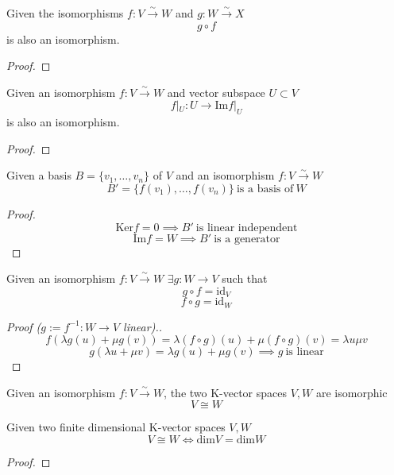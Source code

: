 \begin{lemma}
   Given the isomorphisms \(f: V \xrightarrow{\sim} W\) and \(g: W \xrightarrow{\sim} X\)
   \[g \circ f\]
   is also an isomorphism.
\end{lemma}
\begin{proof}
\end{proof}

\begin{lemma}
   Given an isomorphism \(f: V \xrightarrow{\sim} W\) and vector subspace \(U \subset V\)
   \[f|_{U}: U \to \text{Im}f|_{U}\]
   is also an isomorphism.
\end{lemma}
\begin{proof}
\end{proof}

\begin{lemma}
   Given a basis \(B = \{v_1, \ldots, v_n\}\) of \(V\) and an isomorphism \(f: V \xrightarrow{\sim} W\)
   \[B' = \{f(v_1), \ldots, f(v_n)\}~\text{is a basis of}~W\]
\end{lemma}
\begin{proof}
   \[\text{Ker}f = 0 \implies B'~\text{is linear independent}\]
   \[\text{Im}f = W \implies B'~\text{is a generator}\]
\end{proof}

\begin{lemma}
   Given an isomorphism \(f: V \xrightarrow{\sim} W\) \(\exists g: W \to V\) such that
   \[g \circ f = \text{id}_V\]
   \[f \circ g = \text{id}_W\]
\end{lemma}
\begin{proof}[Proof (\(g := f^{-1}: W \to V\) linear).]
   \[f(\lambda g(u) + \mu g(v)) = \lambda (f \circ g)(u) + \mu (f \circ g)(v) = \lambda u \mu v\]
   \[g(\lambda u + \mu v) = \lambda g(u) + \mu g(v) \implies g~\text{is linear}\]
\end{proof}

\begin{definition}[Isomorphic]
   Given an isomorphism \(f: V \xrightarrow{\sim} W\), the two K-vector spaces \(V, W\) are isomorphic
   \[V \cong W\]
\end{definition}

\begin{theorem}
   Given two finite dimensional K-vector spaces \(V, W\)
   \[V \cong W \iff \text{dim}V = \text{dim}W\]
\end{theorem}
\begin{proof}
\end{proof}

